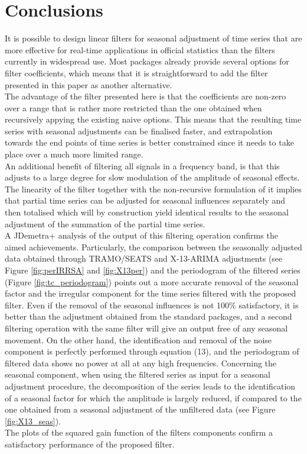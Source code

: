 \documentclass[english,blauw]{cbsdiscussionpaper}
\begin{document}
\section{Conclusions}
It is possible to design linear filters for seasonal adjustment of time series that are more effective for real-time applications in official statistics than the filters currently in widespread use. Most packages already provide several options for filter coefficients, which means that it is straightforward to add the filter presented in this paper as another alternative.\\The advantage of the filter presented here is that the coefficients are non-zero over a range that is rather more restricted than the one obtained when recursively appying the existing naive options. This means that the resulting time series with seasonal adjustments can be finalised faster, and extrapolation towards the end points of time series is better constrained since it needs to take place over a much more limited range.\\An additional benefit of filtering all signals in a frequency band, is that this adjusts to a large degree for slow modulation of the amplitude of seasonal effects.\\The linearity of the filter together with the non-recursive formulation of it implies that partial time series can be adjusted for seasonal influences separately and then totalised which will by construction yield identical results to the seasonal adjustment of the summation of the partial time series.\\A JDemetra+ analysis of the output of this filtering operation confirms the aimed achievements. Particularly, the comparison between the seasonally adjusted data obtained through TRAMO/SEATS and X-13-ARIMA adjustments (see Figure \ref{fig:perIRRSA} and \ref{fig:X13per}) and the periodogram of the filtered series (Figure \ref{fig:tc_periodogram}) points out a more accurate removal of the seasonal factor and the irregular component for the time series filtered with the proposed filter. Even if the removal of the seasonal influences is not 100\% satisfactory, it is better than the adjustment obtained from the standard packages, and a second filtering operation with the same filter will give an output free of any seasonal movement. On the other hand, the identification and removal of the noise component is perfectly performed through equation (13), and the periodogram of filtered data shows no power at all at any high frequencies. Concerning the seasonal component, when using the filtered series as input for a seasonal adjustment procedure, the decomposition of the series leads to the identification of a seasonal factor for which the amplitude is largely reduced, if compared to the one obtained from a seasonal adjustment of the unfiltered data (see Figure \ref{fig:X13_seas}). \\The plots of the squared gain function of the filters components confirm a satisfactory performance of the proposed filter.
\end{document}
